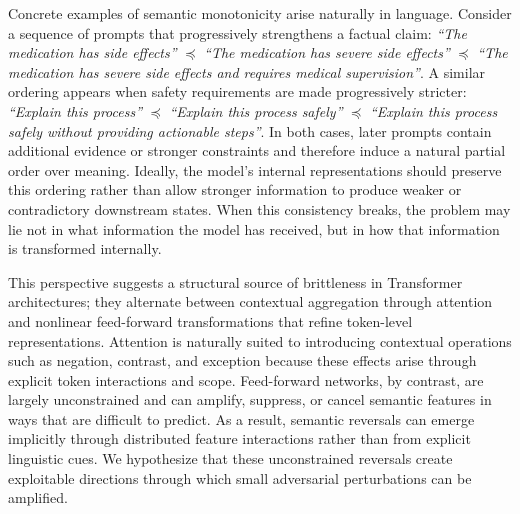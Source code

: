 \documentclass{article}
\theoremstyle{plain}
\theoremstyle{definition}
\theoremstyle{remark}
\begin{document}

Concrete examples of semantic monotonicity arise naturally in language. Consider a sequence of prompts that progressively strengthens a factual claim:
\emph{``The medication has side effects''}
$\preceq$
\emph{``The medication has severe side effects''}
$\preceq$
\emph{``The medication has severe side effects and requires medical supervision''}.
A similar ordering appears when safety requirements are made progressively stricter:
\emph{``Explain this process''}
$\preceq$
\emph{``Explain this process safely''}
$\preceq$
\emph{``Explain this process safely without providing actionable steps''}.
In both cases, later prompts contain additional evidence or stronger constraints and therefore induce a natural partial order over meaning. Ideally, the model's internal representations should preserve this ordering rather than allow stronger information to produce weaker or contradictory downstream states. When this consistency breaks, the problem may lie not in what information the model has received, but in how that information is transformed internally.

This perspective suggests a structural source of brittleness in Transformer architectures; they alternate between contextual aggregation through attention and nonlinear feed-forward transformations that refine token-level representations. Attention is naturally suited to introducing contextual operations such as negation, contrast, and exception because these effects arise through explicit token interactions and scope. Feed-forward networks, by contrast, are largely unconstrained and can amplify, suppress, or cancel semantic features in ways that are difficult to predict. As a result, semantic reversals can emerge implicitly through distributed feature interactions rather than from explicit linguistic cues. We hypothesize that these unconstrained reversals create exploitable directions through which small adversarial perturbations can be amplified.
\end{document}
